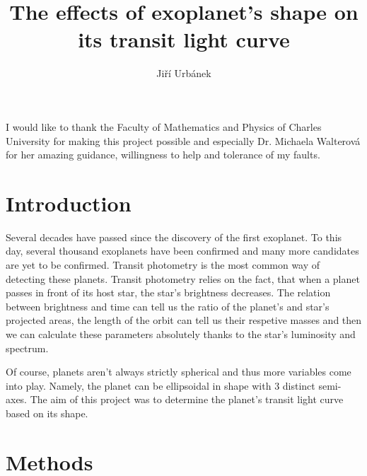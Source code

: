 \documentclass[10pt]{article}
\title{The effects of exoplanet's shape on its transit light curve}
\author{Jiří Urbánek}
\numberwithin{equation}{subsection}
\begin{document}
\maketitle
I would like to thank the Faculty of Mathematics and Physics of Charles University for
making this project possible and especially Dr. Michaela Walterová for her amazing
guidance, willingness to help and tolerance of my faults.
\section{Introduction}
Several decades have passed since the discovery of the first exoplanet. To this day,
several thousand exoplanets have been confirmed and many more candidates are yet to
be confirmed. Transit photometry is the most common way of detecting these planets.
Transit photometry relies on the fact, that when a planet passes in front of its host
star, the star's brightness decreases. The relation between brightness and time can tell
us the ratio of the planet's and star's projected areas, the length of the orbit can tell
us their respetive masses and then we can calculate these parameters absolutely thanks to
the star's luminosity and spectrum.

Of course, planets aren't always strictly spherical and thus more variables come into play.
Namely, the planet can be ellipsoidal in shape with 3 distinct semi-axes. The aim of this
project was to determine the planet's transit light curve based on its shape.
\section{Methods}
\end{document}
